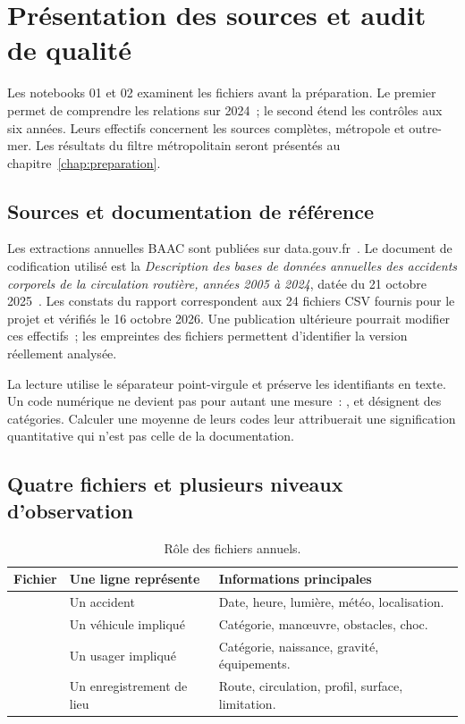 \chapter{Présentation des sources et audit de qualité}
\label{chap:audit}

Les notebooks 01 et 02 examinent les fichiers avant la préparation. Le premier permet
de comprendre les relations sur 2024~; le second étend les contrôles aux six années.
Leurs effectifs concernent les sources complètes, métropole et outre-mer. Les résultats
du filtre métropolitain seront présentés au chapitre~\ref{chap:preparation}.

\section{Sources et documentation de référence}
Les extractions annuelles BAAC sont publiées sur data.gouv.fr~\cite{baac}. Le document
de codification utilisé est la \textit{Description des bases de données annuelles des
accidents corporels de la circulation routière, années 2005 à 2024}, datée du
21 octobre 2025~\cite{doc-onisr}. Les constats du rapport correspondent aux 24 fichiers
CSV fournis pour le projet et vérifiés le 16 octobre 2026. Une publication ultérieure
pourrait modifier ces effectifs~; les empreintes des fichiers permettent d'identifier
la version réellement analysée.

La lecture utilise le séparateur point-virgule et préserve les identifiants en texte.
Un code numérique ne devient pas pour autant une mesure~: , 
et  désignent des catégories. Calculer une moyenne de leurs codes leur
attribuerait une signification quantitative qui n'est pas celle de la documentation.

\section{Quatre fichiers et plusieurs niveaux d'observation}
\begin{table}[htbp]\centering\small\renewcommand{\arraystretch}{1.2}
\caption{Rôle des fichiers annuels.}\label{tab:tables-source}
\begin{tabularx}{\textwidth}{@{}lLL@{}}\toprule
Fichier & Une ligne représente & Informations principales\\\midrule
{} & Un accident & Date, heure, lumière, météo, localisation.\\
 & Un véhicule impliqué & Catégorie, manœuvre, obstacles, choc.\\
 & Un usager impliqué & Catégorie, naissance, gravité, équipements.\\
 & Un enregistrement de lieu & Route, circulation, profil, surface, limitation.\\\bottomrule
\end{tabularx}
\end{table}

